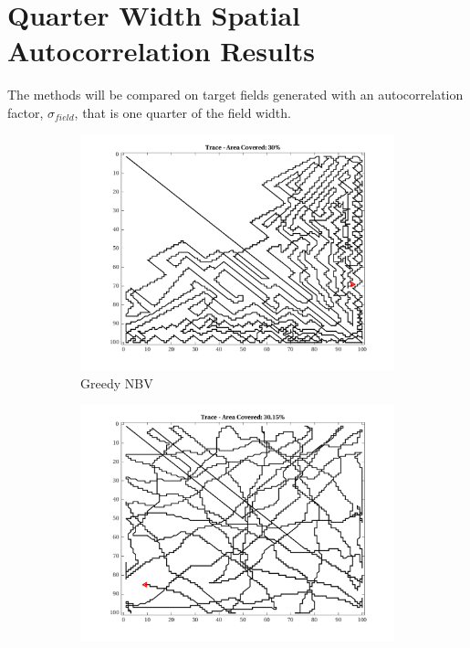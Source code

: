 \FloatBarrier
\clearpage
\section{Quarter Width Spatial Autocorrelation Results}
The methods will be compared on target fields generated with an autocorrelation factor, $\sigma_{field}$, that is one quarter of the field width.

\begin{figure}[htb!]
    \centering
    \begin{subfigure}[t]{0.25\textwidth}
        \centering
        \includegraphics[width=\linewidth]{figures/path_greedy_30p_100x100_sf_25_seed_1.png}
        \captionsetup{skip=0.20\baselineskip,size=footnotesize}
        \caption{Greedy NBV}
    \end{subfigure}%
    \begin{subfigure}[t]{0.25\textwidth}
        \centering
        \includegraphics[width=\linewidth]{figures/path_mc_30p_100x100_sf_25_seed_1.png}

\end{subfigure}
\end{figure}
